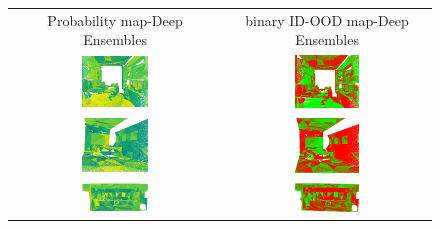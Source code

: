     \begin{figure}[h!]
        \centering
        \begin{tabular}{cc}
            Probability map-Deep Ensembles & binary ID-OOD map-Deep Ensembles \\
            \includegraphics[width=0.33\textwidth, height=0.18\textheight]{images/ood_imgs/de_s3dis/ofc_3_de_prob.pdf}& 
            \includegraphics[width=0.33\textwidth, height=0.18\textheight]{images/ood_imgs/de_s3dis/de_prob_2.pdf}\\

            \includegraphics[width=0.33\textwidth, height=0.18\textheight]{images/ood_imgs/de_s3dis/cf1_de_prob.pdf}& 
            \includegraphics[width=0.33\textwidth, height=0.18\textheight]{images/ood_imgs/de_s3dis/de_prob_4.pdf}\\

            \includegraphics[width=0.33\textwidth, height=0.18\textheight]{images/ood_imgs/de_s3dis/pnt_1_de_prob.pdf}& 
            \includegraphics[width=0.33\textwidth, height=0.18\textheight]{images/ood_imgs/de_s3dis/de_prob_3.pdf}\\


\end{tabular}
\end{figure}
